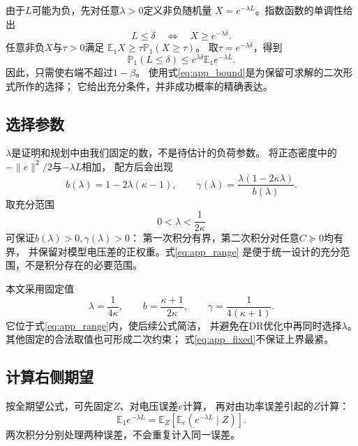 \documentclass[journal,10pt]{IEEEtran}
\newcommand{\E}{\mathbb E}
\newcommand{\Prob}{\mathbb P}
\begin{document}
由于$L$可能为负，先对任意$\lambda>0$定义非负随机量
$X=e^{-\lambda L}$。指数函数的单调性给出
\[
L\le\delta\quad\Longleftrightarrow\quad
X\ge e^{-\lambda\delta}.
\]
任意非负$X$与$\tau>0$满足
$\E_1X\ge\tau\Prob_1(X\ge\tau)$。
取$\tau=e^{-\lambda\delta}$，得到
\begin{equation}
\Prob_1(L\le\delta)
\le e^{\lambda\delta}\E_1e^{-\lambda L}. \label{eq:app_bound}
\end{equation}
因此，只需使右端不超过$1-\beta$。
使用式\eqref{eq:app_bound}是为保留可求解的二次形式所作的选择；
它给出充分条件，并非成功概率的精确表达。

\subsection{选择参数}
$\lambda$是证明和规划中由我们固定的数，不是待估计的负荷参数。
将正态密度中的$-\|e\|^2/2$与$-\lambda L$相加，
配方后会出现
\begin{equation}
b(\lambda)=1-2\lambda(\kappa-1),\qquad
\gamma(\lambda)
=\frac{\lambda(1-2\kappa\lambda)}{b(\lambda)}. \label{eq:app_general}
\end{equation}
取充分范围
\begin{equation}
0<\lambda<\frac1{2\kappa} \label{eq:app_range}
\end{equation}
可保证$b(\lambda)>0,\gamma(\lambda)>0$：
第一次积分有界，第二次积分对任意$C\succeq0$均有界，
并保留对模型电压差的正权重。式\eqref{eq:app_range}
是便于统一设计的充分范围，不是积分存在的必要范围。

本文采用固定值
\begin{equation}
\lambda=\frac1{4\kappa},\qquad
b=\frac{\kappa+1}{2\kappa},\qquad
\gamma=\frac1{4(\kappa+1)}. \label{eq:app_fixed}
\end{equation}
它位于式\eqref{eq:app_range}内，使后续公式简洁，
并避免在DR优化中再同时选择$\lambda$。
其他固定的合法取值也可形成二次约束；
式\eqref{eq:app_fixed}不保证上界最紧。

\subsection{计算右侧期望}
按全期望公式，可先固定$Z$、对电压误差$e$计算，
再对由功率误差引起的$Z$计算：
\begin{equation}
\E_1e^{-\lambda L}
=\E_Z\!\left[\E_e(e^{-\lambda L}\mid Z)\right]. \label{eq:app_tower}
\end{equation}
两次积分分别处理两种误差，不会重复计入同一误差。
\end{document}
